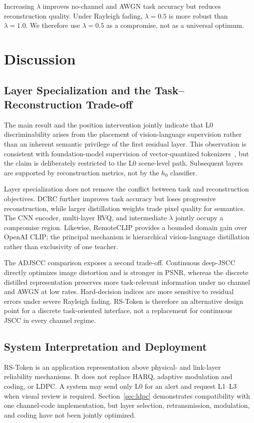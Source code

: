 \documentclass[letterpaper,journal]{IEEEtran}
\begin{document}
Increasing $\lambda$ improves no-channel and AWGN task accuracy but reduces reconstruction quality. Under Rayleigh fading, $\lambda=0.5$ is more robust than $\lambda=1.0$. We therefore use $\lambda=0.5$ as a compromise, not as a universal optimum.

\section{Discussion}
\label{sec:discussion}

\subsection{Layer Specialization and the Task--Reconstruction Trade-off}
The main result and the position intervention jointly indicate that L0 discriminability arises from the placement of vision-language supervision rather than an inherent semantic privilege of the first residual layer. This observation is consistent with foundation-model supervision of vector-quantized tokenizers~\cite{beitv2}, but the claim is deliberately restricted to the L0 scene-level path. Subsequent layers are supported by reconstruction metrics, not by the $h_0$ classifier.

Layer specialization does not remove the conflict between task and reconstruction objectives. DCRC further improves task accuracy but loses progressive reconstruction, while larger distillation weights trade pixel quality for semantics. The CNN encoder, multi-layer RVQ, and intermediate $\lambda$ jointly occupy a compromise region. Likewise, RemoteCLIP provides a bounded domain gain over OpenAI CLIP; the principal mechanism is hierarchical vision-language distillation rather than exclusivity of one teacher.

The ADJSCC comparison exposes a second trade-off. Continuous deep-JSCC directly optimizes image distortion and is stronger in PSNR, whereas the discrete distilled representation preserves more task-relevant information under no channel and AWGN at low rates. Hard-decision indices are more sensitive to residual errors under severe Rayleigh fading. RS-Token is therefore an alternative design point for a discrete task-oriented interface, not a replacement for continuous JSCC in every channel regime.

\subsection{System Interpretation and Deployment}
RS-Token is an application representation above physical- and link-layer reliability mechanisms. It does not replace HARQ, adaptive modulation and coding, or LDPC. A system may send only L0 for an alert and request L1--L3 when visual review is required. Section~\ref{sec:ldpc} demonstrates compatibility with one channel-code implementation, but layer selection, retransmission, modulation, and coding have not been jointly optimized.
\end{document}
